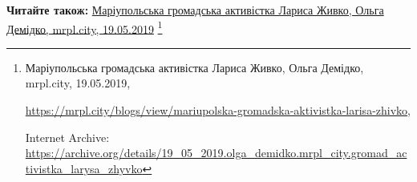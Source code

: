  
 
 
 
 

\def\pubIA{https://archive.org/details/19_05_2019.olga_demidko.mrpl_city.gromad_activistka_larysa_zhyvko}
\def\pubTitle{Маріупольська громадська активістка Лариса Живко}
\def\pubDate{19.05.2019}
\def\pubOrigin{https://mrpl.city/blogs/view/mariupolska-gromadska-aktivistka-larisa-zhivko}
\def\pubAuthor{Ольга Демідко}

\textbf{Читайте також:} \href{\pubIA}{%
\pubTitle, \pubAuthor, mrpl.city, \pubDate}%
\footnote{\pubTitle, \pubAuthor, mrpl.city, \pubDate, \par\url{\pubOrigin}, \par Internet Archive: \url{\pubIA}}
